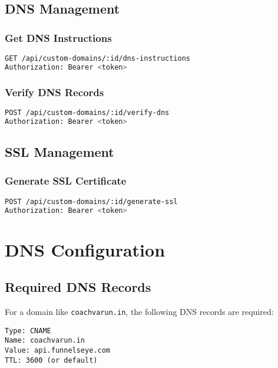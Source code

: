 \documentclass[12pt,a4paper]{article}
\begin{document}
\subsection{DNS Management}

\subsubsection{Get DNS Instructions}
\begin{lstlisting}[language=bash,frame=single]
GET /api/custom-domains/:id/dns-instructions
Authorization: Bearer <token>
\end{lstlisting}

\subsubsection{Verify DNS Records}
\begin{lstlisting}[language=bash,frame=single]
POST /api/custom-domains/:id/verify-dns
Authorization: Bearer <token>
\end{lstlisting}

\subsection{SSL Management}

\subsubsection{Generate SSL Certificate}
\begin{lstlisting}[language=bash,frame=single]
POST /api/custom-domains/:id/generate-ssl
Authorization: Bearer <token>
\end{lstlisting}

\section{DNS Configuration}

\subsection{Required DNS Records}

For a domain like \texttt{coachvarun.in}, the following DNS records are required:

\begin{lstlisting}[frame=single]
Type: CNAME
Name: coachvarun.in
Value: api.funnelseye.com
TTL: 3600 (or default)
\end{lstlisting}
\end{document}
